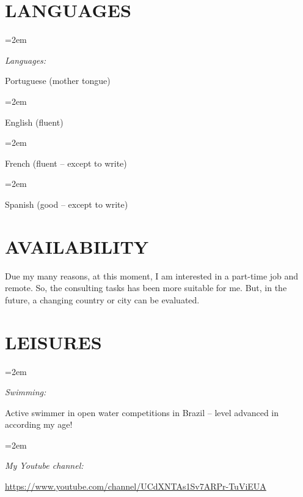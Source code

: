 \documentclass[paper=a4,fontsize=11pt]{scrartcl} %
\newlength{\spacebox}
\newcommand{\sepspace}{\vspace*{0.8em}}		%
\newcommand{\NewPart}[1]{\section*{\uppercase{#1}}}
\newcommand{\PersonalEntry}[2]{
		\noindent\hangindent=2em\hangafter=0 %
		\parbox{\spacebox}{        %
		\textit{#1}}		       %
		\hspace{1.5em} #2 \par}    %
\newcommand{\SkillsEntry}[2]{      %
		\noindent\hangindent=2em\hangafter=0 %
		\parbox{\spacebox}{        %
		\textit{#1}}			   %
		\hspace{1.5em} #2 \par}    %
\begin{document}
\NewPart{Languages}{}

\SkillsEntry{Languages:} {Portuguese (mother tongue)}
\SkillsEntry{}{English (fluent)}
\SkillsEntry{}{French (fluent -- except to write)}
\SkillsEntry{}{Spanish (good -- except to write)}


\NewPart{Availability}{}

Due my many reasons, at this moment, I am interested in a part-time job and remote. So, the consulting tasks has been more suitable for me. But, in the future, a changing country or city can be evaluated.

\NewPart{Leisures}{}

\SkillsEntry{Swimming:}{Active swimmer in open water competitions in Brazil -- level advanced in according my age!}
\sepspace

\SkillsEntry{My Youtube channel:} {\url{https://www.youtube.com/channel/UCdXNTAs1Sv7ARPr-TuViEUA}}
\end{document}
